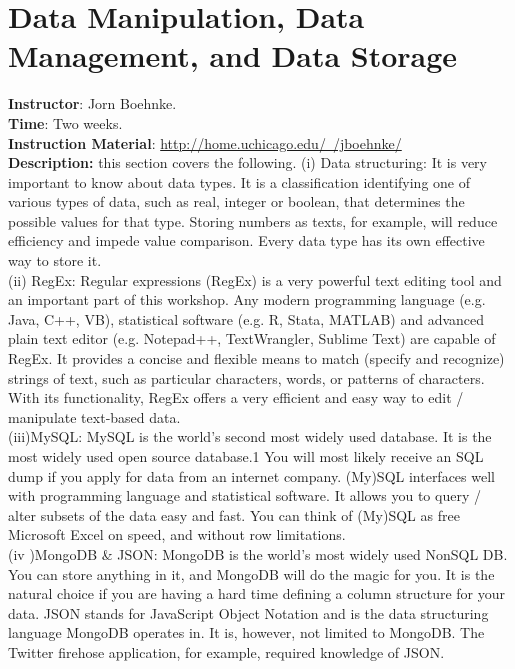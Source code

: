 \section{Data Manipulation, Data Management, and Data Storage}
\noindent \textbf{Instructor}: Jorn Boehnke.\\
\noindent \textbf{Time}: Two weeks.\\
\noindent \textbf{Instruction Material}: \href{http://home.uchicago.edu/~/jboehnke/}{http://home.uchicago.edu/~/jboehnke/}\\
\noindent \textbf{Description:} this section covers the following. (i) Data structuring: It is very important to know about data types. It is a classification identifying one of various types of data, such as real, integer or boolean, that determines the possible values for that type. Storing numbers as texts, for example, will reduce efficiency and impede value comparison. Every data type has its own effective way to store it.\\
\indent (ii) RegEx: Regular expressions (RegEx) is a very powerful text editing tool and an important part of this workshop. Any modern programming language (e.g. Java, C++, VB), statistical software (e.g. R, Stata, MATLAB) and advanced plain text editor (e.g. Notepad++, TextWrangler, Sublime Text) are capable of RegEx. It provides a concise and flexible means to match (specify and recognize) strings of text, such as particular characters, words, or patterns of characters. With its functionality, RegEx offers a very efficient and easy way to edit / manipulate text‐based data.\\
\indent (iii)MySQL: MySQL is the world’s second most widely used database. It is the most widely used open source database.1 You will most likely receive an SQL dump if you apply for data from an internet company. (My)SQL interfaces well with programming language and statistical software. It allows you to query / alter subsets of the data easy and fast. You can think of (My)SQL as free Microsoft Excel on speed, and without row limitations.\\
\indent (iv )MongoDB \& JSON: MongoDB is the world’s most widely used NonSQL DB. You can store anything in it, and MongoDB will do the magic for you. It is the natural choice if you are having a hard time defining a column structure for your data. JSON stands for JavaScript Object Notation and is the data structuring language MongoDB operates in. It is, however, not limited to MongoDB. The Twitter firehose application, for example, required knowledge of JSON.
